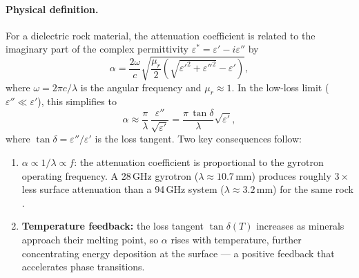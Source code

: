 \documentclass[12pt, a4paper]{article}
\begin{document}
\paragraph{Physical definition.}
For a dielectric rock material, the attenuation coefficient is related to
the imaginary part of the complex permittivity
$\varepsilon^* = \varepsilon' - i\varepsilon''$ by
\begin{equation}
    \alpha = \frac{2\omega}{c}\sqrt{
        \frac{\mu_r}{2}\!\left(\sqrt{{\varepsilon'}^2 + {\varepsilon''}^2}
                               - \varepsilon'\right)},
    \label{eq:alpha_def}
\end{equation}
where $\omega = 2\pi c/\lambda$ is the angular frequency and
$\mu_r \approx 1$.  In the low-loss limit ($\varepsilon'' \ll \varepsilon'$),
this simplifies to
\begin{equation}
    \alpha \approx \frac{\pi}{\lambda}\,
                   \frac{\varepsilon''}{\sqrt{\varepsilon'}}
           = \frac{\pi\,\tan\delta}{\lambda}\sqrt{\varepsilon'},
    \label{eq:alpha_approx}
\end{equation}
where $\tan\delta = \varepsilon''/\varepsilon'$ is the loss tangent.
Two key consequences follow:
\begin{enumerate}[noitemsep]
    \item \textbf{$\alpha \propto 1/\lambda \propto f$}: the attenuation
    coefficient is proportional to the gyrotron operating frequency.
    A 28\,GHz gyrotron ($\lambda \approx 10.7\,\mathrm{mm}$) produces
    roughly $3\times$ less surface attenuation than a 94\,GHz system
    ($\lambda \approx 3.2\,\mathrm{mm}$) for the same rock
    \citep{woskov2009mmw}.

    \item \textbf{Temperature feedback:} the loss tangent $\tan\delta(T)$
    increases as minerals approach their melting point, so $\alpha$ rises
    with temperature, further concentrating energy deposition at the
    surface — a positive feedback that accelerates phase transitions.
\end{enumerate}
\end{document}
